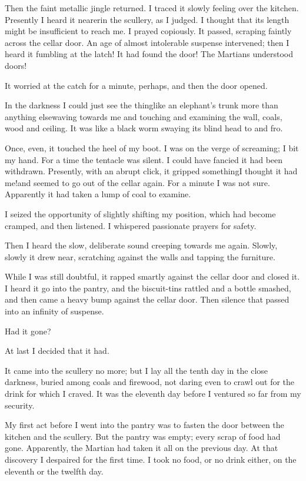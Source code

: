 Then the faint metallic jingle returned. I traced it slowly feeling
over the kitchen. Presently I heard it nearer\dash{}in the scullery, as
I judged. I thought that its length might be insufficient to reach
me. I prayed copiously. It passed, scraping faintly across the
cellar door. An age of almost intolerable suspense intervened; then
I heard it fumbling at the latch! It had found the door! The
Martians understood doors!

It worried at the catch for a minute, perhaps, and then the door
opened.

In the darkness I could just see the thing\dash{}like an elephant's
trunk more than anything else\dash{}waving towards me and touching and
examining the wall, coals, wood and ceiling. It was like a black
worm swaying its blind head to and fro.

Once, even, it touched the heel of my boot. I was on the verge of
screaming; I bit my hand. For a time the tentacle was silent. I
could have fancied it had been withdrawn. Presently, with an abrupt
click, it gripped something\dash{}I thought it had me!\dash{}and seemed to go
out of the cellar again. For a minute I was not sure. Apparently it
had taken a lump of coal to examine.

I seized the opportunity of slightly shifting my position, which
had become cramped, and then listened. I whispered passionate
prayers for safety.

Then I heard the slow, deliberate sound creeping towards me again.
Slowly, slowly it drew near, scratching against the walls and
tapping the furniture.

While I was still doubtful, it rapped smartly against the cellar
door and closed it. I heard it go into the pantry, and the
biscuit-tins rattled and a bottle smashed, and then came a heavy
bump against the cellar door. Then silence that passed into an
infinity of suspense.

Had it gone?

At last I decided that it had.

It came into the scullery no more; but I lay all the tenth day in
the close darkness, buried among coals and firewood, not daring
even to crawl out for the drink for which I craved. It was the
eleventh day before I ventured so far from my security.

My first act before I went into the pantry was to fasten the door
between the kitchen and the scullery. But the pantry was empty;
every scrap of food had gone. Apparently, the Martian had taken it
all on the previous day. At that discovery I despaired for the
first time. I took no food, or no drink either, on the eleventh or
the twelfth day.

